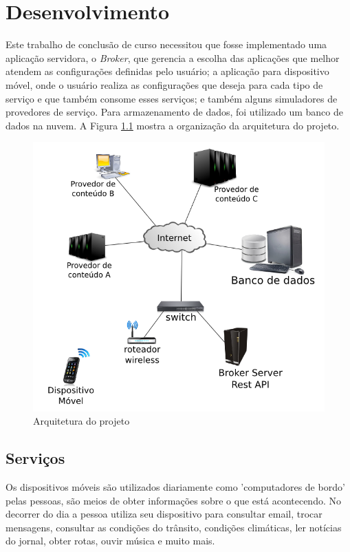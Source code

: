 \chapter{Desenvolvimento}\label{cha:desenvolvimento}
Este trabalho de conclusão de curso necessitou que fosse implementado uma aplicação servidora, o \textit{Broker}, que gerencia a escolha das aplicações que melhor atendem as configurações definidas pelo usuário; a aplicação para dispositivo móvel, onde o usuário realiza as configurações que deseja para cada tipo de serviço e que também consome esses serviços; e também alguns simuladores de provedores de serviço. Para armazenamento de dados, foi utilizado um banco de dados na nuvem. A Figura \ref{fig:arquitetura} mostra a organização da arquitetura do projeto.

\begin{figure}[!htb]
  \centering
  \includegraphics[width=.7\textwidth]{arquitetura.png} %
  \caption[Arquitetura do projeto]{Arquitetura do projeto}
  \label{fig:arquitetura}
\end{figure}

\section{Serviços}
Os dispositivos móveis são utilizados diariamente como 'computadores de bordo' pelas pessoas, são meios de obter informações sobre o que está acontecendo. No decorrer do dia a pessoa utiliza seu dispositivo para consultar email, trocar mensagens, consultar as condições do trânsito, condições climáticas, ler notícias do jornal, obter rotas, ouvir música e muito mais.

